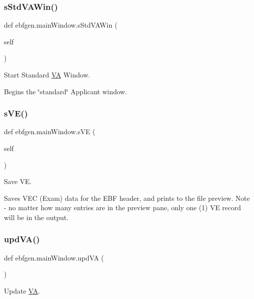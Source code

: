 \subsubsection{\texorpdfstring{s\+Std\+V\+A\+Win()}{sStdVAWin()}}
{\footnotesize\ttfamily def ebfgen.\+main\+Window.\+s\+Std\+V\+A\+Win (\begin{DoxyParamCaption}\item[{}]{self }\end{DoxyParamCaption})}



Start Standard \hyperlink{classebfgen_1_1VA}{VA} Window. 

Begins the \char`\"{}standard\char`\"{} Applicant window. \mbox{\label{classebfgen_1_1mainWindow_a95a4973e95a3ca29f3d4a39aaf0d0aa0}} 
\subsubsection{\texorpdfstring{s\+V\+E()}{sVE()}}
{\footnotesize\ttfamily def ebfgen.\+main\+Window.\+s\+VE (\begin{DoxyParamCaption}\item[{}]{self }\end{DoxyParamCaption})}



Save VE. 

Saves V\+EC (Exam) data for the E\+BF header, and prints to the file preview. Note -\/ no matter how many entries are in the preview pane, only one (1) VE record will be in the output. \mbox{\label{classebfgen_1_1mainWindow_a062c7d1268146c82264a87132c0f4265}} 
\subsubsection{\texorpdfstring{upd\+V\+A()}{updVA()}}
{\footnotesize\ttfamily def ebfgen.\+main\+Window.\+upd\+VA (\begin{DoxyParamCaption}{ }\end{DoxyParamCaption})}



Update \hyperlink{classebfgen_1_1VA}{VA}. 

